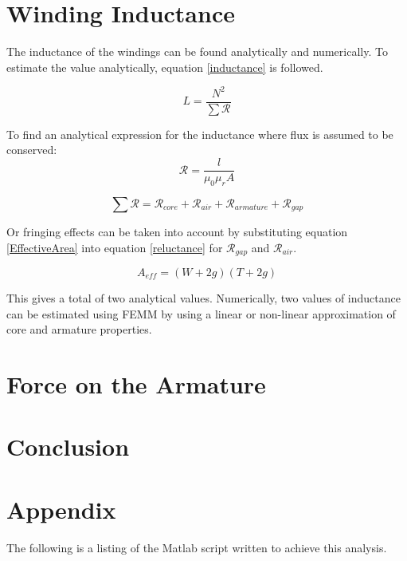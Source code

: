 \documentclass[a4paper]{IEEEtran}
\begin{document}
\section{Winding Inductance}
The inductance of the windings can be found analytically and numerically. To estimate the value analytically, equation \ref{inductance} is followed. 

\begin{equation}
L = \frac{N^2}{\sum{\mathcal{R}}}
\label{inductance}
\end{equation}

To find an analytical expression for the inductance where flux is assumed to be conserved:
\begin{equation}
\mathcal{R} =  \frac{l}{\mu_{0}\mu_{r}A}
\label{reluctance}
\end{equation}


\begin{equation}
\sum{\mathcal{R}} = \mathcal{R}_{core} + \mathcal{R}_{air} + \mathcal{R}_{armature} + \mathcal{R}_{gap}
\label{summm}
\end{equation}

Or fringing effects can be taken into account by substituting equation \ref{EffectiveArea} into equation \ref{reluctance} for $\mathcal{R}_{gap}$ and $\mathcal{R}_{air}$. 

\begin{equation}
A_{eff} = (W + 2g)(T + 2g)
\label{EffectiveArea}
\end{equation}

This gives a total of two analytical values. Numerically, two values of inductance can be estimated using FEMM by using a linear or non-linear approximation of core and armature properties.



\section{Force on the Armature}

\section{Conclusion}

\pagebreak
\onecolumn
\section{Appendix}
The following is a listing of the Matlab script written to achieve this analysis.

\end{document}
